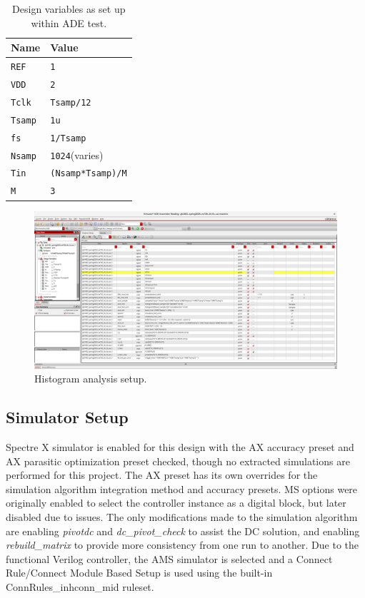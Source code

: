 \documentclass[11pt,letterpaper]{article}
\begin{document}
\begin{table}[htbp!]
    \centering
    \begin{tabular}{ll}
    \toprule
    \textbf{Name} & \textbf{Value} \\
    \midrule
        \texttt{REF} & \texttt{1} \\
        \texttt{VDD} & \texttt{2} \\
        \texttt{Tclk} & \texttt{Tsamp/12} \\
        \texttt{Tsamp} & \texttt{1u} \\
        \texttt{fs} & \texttt{1/Tsamp} \\
        \texttt{Nsamp} & \texttt{1024}\qquad(varies) \\
        \texttt{Tin} & \texttt{(Nsamp*Tsamp)/M} \\
        \texttt{M} & \texttt{3} \\
    \bottomrule
    \end{tabular}
    \caption{Design variables as set up within ADE test.}\label{tab:des_var}
\end{table}

\begin{figure}[htbp!]
		\centering
	    \includegraphics[width=\textwidth]{images/maestro_setup.png}
		\caption{Histogram analysis setup.}\label{fig:maestro}
\end{figure}

\subsection{Simulator Setup}

Spectre X simulator is enabled for this design with the AX accuracy preset and AX parasitic optimization preset checked, though no extracted simulations are performed for this project. The AX preset has its own overrides for the simulation algorithm integration method and accuracy presets. MS options were originally enabled to select the controller instance as a digital block, but later disabled due to issues. The only modifications made to the simulation algorithm are enabling \emph{pivotdc} and \emph{dc\_pivot\_check} to assist the DC solution, and enabling \emph{rebuild\_matrix} to provide more consistency from one run to another. Due to the functional Verilog controller, the AMS simulator is selected and a Connect Rule/Connect Module Based Setup is used using the built-in ConnRules\_inhconn\_mid ruleset.
\end{document}

